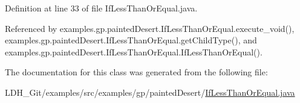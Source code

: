 Definition at line 33 of file If\-Less\-Than\-Or\-Equal.\-java.



Referenced by examples.\-gp.\-painted\-Desert.\-If\-Less\-Than\-Or\-Equal.\-execute\-\_\-void(), examples.\-gp.\-painted\-Desert.\-If\-Less\-Than\-Or\-Equal.\-get\-Child\-Type(), and examples.\-gp.\-painted\-Desert.\-If\-Less\-Than\-Or\-Equal.\-If\-Less\-Than\-Or\-Equal().



The documentation for this class was generated from the following file\-:\begin{DoxyCompactItemize}
\item 
L\-D\-H\-\_\-\-Git/examples/src/examples/gp/painted\-Desert/\hyperlink{_if_less_than_or_equal_8java}{If\-Less\-Than\-Or\-Equal.\-java}\end{DoxyCompactItemize}
